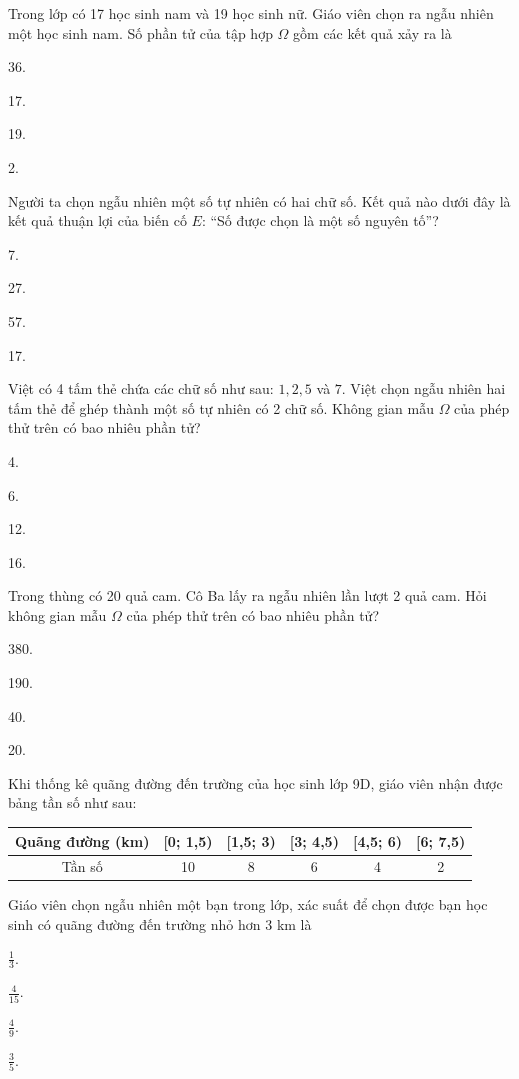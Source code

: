 \documentclass[%
    fontsize=12pt,%
    chapterprefix=false,%
    open=right,%
    twoside=false,%
    numbers=noenddot,%
    headings=optiontohead,%
    final,%
    DIV=15,%
    parskip=half %
]{scrbook}
\begin{document}
\begin{tracnghiem}
\item Trong lớp có 17 học sinh nam và 19 học sinh nữ. Giáo viên chọn ra ngẫu nhiên một học sinh nam. Số phần tử của tập hợp $\Omega$ gồm các kết quả xảy ra là
\begin{options}
  \item 36.
  \item 17.
  \item 19.
  \item 2.
\end{options}

\item Người ta chọn ngẫu nhiên một số tự nhiên có hai chữ số. Kết quả nào dưới đây là kết quả thuận lợi của biến cố $E$: ``Số được chọn là một số nguyên tố''?
\begin{options}
  \item 7.
  \item 27.
  \item 57.
  \item 17.
\end{options}

\item Việt có 4 tấm thẻ chứa các chữ số như sau: $\boxed{1}, \boxed{2}, \boxed{5}$ và $\boxed{7}$. Việt chọn ngẫu nhiên hai tấm thẻ để ghép thành một số tự nhiên có 2 chữ số. Không gian mẫu $\Omega$ của phép thử trên có bao nhiêu phần tử?
\begin{options}
  \item 4.
  \item 6.
  \item 12.
  \item 16.
\end{options}

\item Trong thùng có 20 quả cam. Cô Ba lấy ra ngẫu nhiên lần lượt 2 quả cam. Hỏi không gian mẫu $\Omega$ của phép thử trên có bao nhiêu phần tử?
\begin{options}
  \item 380.
  \item 190.
  \item 40.
  \item 20.
\end{options}

\item Khi thống kê quãng đường đến trường của học sinh lớp 9D, giáo viên nhận được bảng tần số như sau: \begin{tabular}{|c|c|c|c|c|c|} \hline Quãng đường (km) & [0; 1,5) & [1,5; 3) & [3; 4,5) & [4,5; 6) & [6; 7,5) \\ \hline Tần số & 10 & 8 & 6 & 4 & 2 \\ \hline \end{tabular} Giáo viên chọn ngẫu nhiên một bạn trong lớp, xác suất để chọn được bạn học sinh có quãng đường đến trường nhỏ hơn 3 km là
\begin{options}
  \item $\frac{1}{3}$.
  \item $\frac{4}{15}$.
  \item $\frac{4}{9}$.
  \item $\frac{3}{5}$.
\end{options}


\end{tracnghiem}
\end{document}
